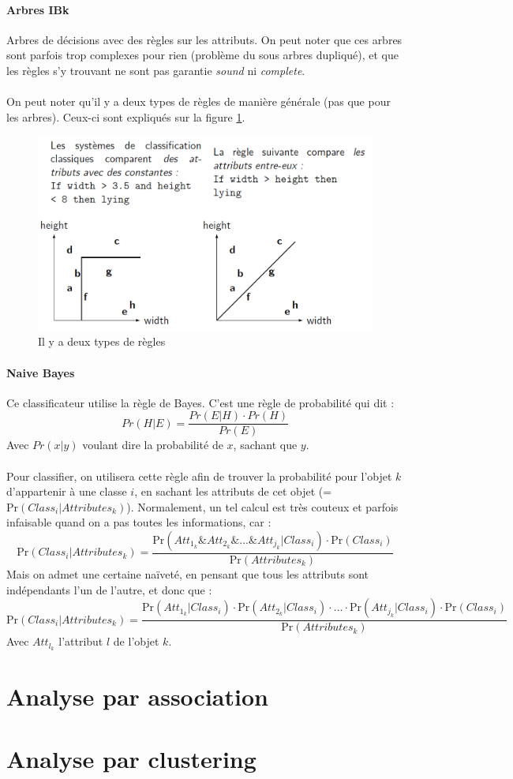 \documentclass[letterpaper, 12pt]{article}
\newcommand{\alinea}{
\hspace*{0.5cm}}
\begin{document}
		\subsection{Arbres IBk}
			\alinea Arbres de décisions avec des règles sur les attributs.
				On peut noter que ces arbres sont parfois trop complexes
				pour rien (problème du sous arbres dupliqué), et que 
				les règles s'y trouvant ne sont pas garantie \textit{sound}
				ni \textit{complete}. \\
			~\\
			\alinea On peut noter qu'il y a deux types de règles de manière 
				générale (pas que pour les arbres). Ceux-ci sont expliqués
				sur la figure \ref{fig:ibk}.
			\begin{figure}[H]
				\centering
				\includegraphics[scale=0.3]{Images/ibk.png}
				\caption{Il y a deux types de règles}
				\label{fig:ibk}
			\end{figure}\noindent
		\subsection{Naive Bayes}
			\alinea	Ce classificateur utilise la règle de Bayes. C'est une 
				règle de probabilité qui dit : 
				$$ Pr(H | E) = \frac{Pr(E | H) \cdot Pr(H)}{Pr(E)} $$
				Avec $Pr(x | y)$ voulant dire la probabilité de $x$, sachant
				que $y$.\\
			~\\
			\alinea Pour classifier, on utilisera cette règle afin de 
				trouver la probabilité pour l'objet $k$ 
				d'appartenir à une classe $i$, en
				sachant les attributs de cet objet 
				(=$\text{Pr}(Class_i | Attributes_k)$). Normalement, 
				un tel calcul
				est très couteux et parfois infaisable quand on a pas
				toutes les informations, car :
				$$ \text{Pr}(Class_i | Attributes_k) = 
				    \frac{\text{Pr}(Att_{1_k}\& 
					Att_{2_k} \& \ldots \& Att_{j_k}| Class_i) 
					\cdot \text{Pr}(Class_i)}{\text{Pr}(Attributes_k)} $$
				Mais on admet une certaine naïveté, en pensant que tous
				les attributs sont indépendants l'un de l'autre, et donc
				que :
				$$ \text{Pr}(Class_i | Attributes_k) =  \frac{
						\text{Pr}(Att_{1_k} | Class_i) \cdot
						\text{Pr}(Att_{2_k} | Class_i) \cdot
						\ldots \cdot
						\text{Pr}(Att_{j_k} | Class_i) \cdot
						\text{Pr}(Class_i)}{\text{Pr}(Attributes_k)}$$
				Avec $Att_{l_k}$ l'attribut $l$ de l'objet $k$.	
%
\part{Analyse par association}
%
\part{Analyse par clustering}
%
\end{document}
